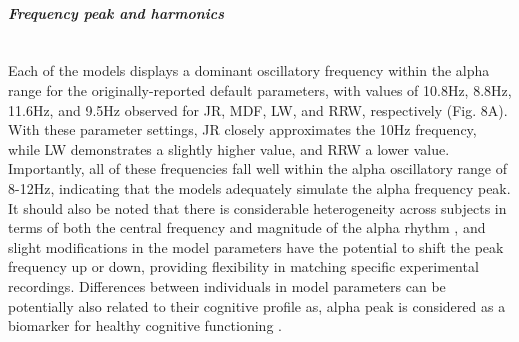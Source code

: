 \documentclass[12pt,twoside]{article}
\begin{document}
\paragraph{\textit{Frequency peak and harmonics}}~\\
Each of the models displays a dominant oscillatory frequency within the alpha range for the originally-reported default parameters, with values of 10.8Hz, 8.8Hz, 11.6Hz, and 9.5Hz observed for JR, MDF, LW, and RRW, respectively (Fig. 8A). With these parameter settings, JR closely approximates the 10Hz frequency, while LW demonstrates a slightly higher value, and RRW a lower value. Importantly, all of these frequencies fall well within the alpha oscillatory range of 8-12Hz, indicating that the models adequately simulate the alpha frequency peak. It should also be noted that there is considerable heterogeneity across subjects in terms of both the central frequency and magnitude of the alpha rhythm \citep{haegens2014inter}, and slight modifications in the model parameters have the potential to shift the peak frequency up or down, providing flexibility in matching specific experimental recordings. Differences between individuals in model parameters can be potentially also related to their cognitive profile as, alpha peak is considered as a biomarker for healthy cognitive functioning \citep{klimesch1999eeg, bacsar2001gamma}.
\end{document}
